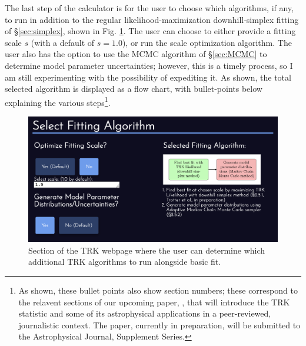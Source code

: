 The last step of the calculator is for the user to choose which algorithms, if any, to run in addition to the regular likelihood-maximization downhill-simplex fitting of \S\ref{sec:simplex}, shown in Fig. \ref{fig:websitechoosealgo}. The user can choose to either provide a fitting scale $s$ (with a default of $s=1.0$), or run the scale optimization algorithm. The user also has the option to use the MCMC algorithm of \S\ref{sec:MCMC} to determine model parameter uncertainties; however, this is a timely process, so I am still experimenting with the possibility of expediting it. As shown, the total selected algorithm is displayed as a flow chart, with bullet-points below explaining the various steps\footnote{As shown, these bullet points also show section numbers; these correspond to the relavent sections of our upcoming paper, \textcite{TRKIapjs}, that will introduce the TRK statistic and some of its astrophysical applications in a peer-reviewed, journalistic context. The paper, currently in preparation, will be submitted to the Astrophysical Journal, Supplement Series.}.
\begin{figure}
    \centering
    \includegraphics[width=1.0\linewidth]{figures/websitechoosealgo.png}
    \caption{Section of the TRK webpage where the user can determine which additional TRK algorithms to run alongside basic fit.}
    \label{fig:websitechoosealgo}
\end{figure}

